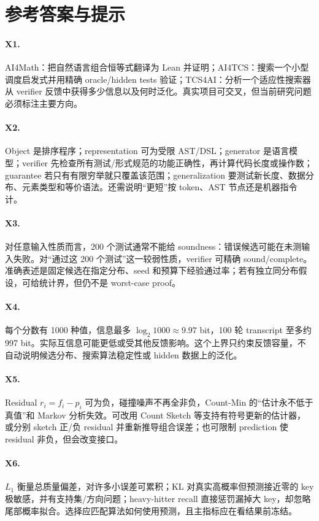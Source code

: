 \section{参考答案与提示}

\paragraph{X1.}
AI4Math：把自然语言组合恒等式翻译为 Lean 并证明；AI4TCS：搜索一个小型调度启发式并用精确 oracle/hidden tests 验证；TCS4AI：分析一个适应性搜索器从 verifier 反馈中获得多少信息以及何时泛化。真实项目可交叉，但当前研究问题必须标注主要方向。

\paragraph{X2.}
Object 是排序程序；representation 可为受限 AST/DSL；generator 是语言模型；verifier 先检查所有测试/形式规范的功能正确性，再计算代码长度或操作数；guarantee 若只有有限穷举就只覆盖该范围；generalization 要测试新长度、数据分布、元素类型和等价语法。还需说明“更短”按 token、AST 节点还是机器指令计。

\paragraph{X3.}
对任意输入性质而言，200 个测试通常不能给 soundness：错误候选可能在未测输入失败。对“通过这 200 个测试”这一较弱性质，verifier 可精确 sound/complete。准确表述是固定候选在指定分布、seed 和预算下经验通过率；若有独立同分布假设，可给统计界，但仍不是 worst-case proof。

\paragraph{X4.}
每个分数有 1000 种值，信息最多 $\log_2 1000\approx9.97$ bit，100 轮 transcript 至多约 997 bit。实际互信息可能更低或受其他反馈影响。这个上界只约束反馈容量，不自动说明候选分布、搜索算法稳定性或 hidden 数据上的泛化。

\paragraph{X5.}
Residual $r_i=f_i-p_i$ 可为负，碰撞噪声不再全非负，Count-Min 的“估计永不低于真值”和 Markov 分析失效。可改用 Count Sketch 等支持有符号更新的估计器，或分别 sketch 正/负 residual 并重新推导组合误差；也可限制 prediction 使 residual 非负，但会改变接口。

\paragraph{X6.}
$L_1$ 衡量总质量偏差，对许多小误差可累积；KL 对真实高概率但预测接近零的 key 极敏感，并有支持集/方向问题；heavy-hitter recall 直接惩罚漏掉大 key，却忽略尾部概率拟合。选择应匹配算法如何使用预测，且主指标应在看结果前冻结。

